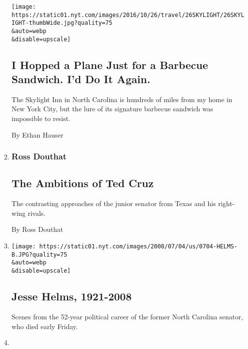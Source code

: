 \begin{enumerate}
  \texttt{[image: https://static01.nyt.com/images/2016/10/26/travel/26SKYLIGHT/26SKYLIGHT-thumbWide.jpg?quality=75\\\&auto=webp\\\&disable=upscale]}

  \hypertarget{i-hopped-a-plane-just-for-a-barbecue-sandwich-id-do-it-again}{%
  \subsection{I Hopped a Plane Just for a Barbecue Sandwich. I'd Do It
  Again.}\label{i-hopped-a-plane-just-for-a-barbecue-sandwich-id-do-it-again}}

  The Skylight Inn in North Carolina is hundreds of miles from my home
  in New York City, but the lure of its signature barbecue sandwich was
  impossible to resist.

  By Ethan Hauser
\item
  \href{https://douthat.blogs.nytimes.com/2013/09/24/the-ambitions-of-ted-cruz/}{}

  \hypertarget{ross-douthat}{%
  \subsubsection{Ross Douthat}\label{ross-douthat}}

  \hypertarget{the-ambitions-of-ted-cruz}{%
  \subsection{The Ambitions of Ted
  Cruz}\label{the-ambitions-of-ted-cruz}}

  The contrasting approaches of the junior senator from Texas and his
  right-wing rivals.

  By Ross Douthat
\item
  \href{/slideshow/2008/07/04/us/0704-HELMS_index.html}{}

  \texttt{[image: https://static01.nyt.com/images/2008/07/04/us/0704-HELMS-B.JPG?quality=75\\\&auto=webp\\\&disable=upscale]}

  \hypertarget{jesse-helms-1921-2008}{%
  \subsection{Jesse Helms, 1921-2008}\label{jesse-helms-1921-2008}}

  Scenes from the 52-year political career of the former North Carolina
  senator, who died early Friday.
\item
  \href{/2011/01/01/us/01milliken.html}{}


\end{enumerate}
